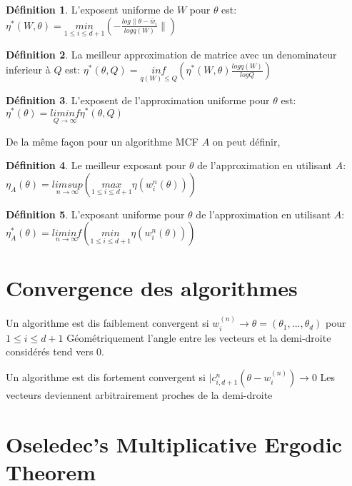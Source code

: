 \documentclass[12pt]{article}
\theoremstyle{plain}%
\theoremstyle{definition}
\newtheorem{dfnt}{Définition}[section]
\theoremstyle{remark}
\begin{document}
\begin{dfnt}
  L'exposent uniforme de $W$ pour $\theta$ est:
  $\eta^*(W,\theta)=\underset{1 \leq i \leq d+1}{min}(-\frac{log \| \theta - \tilde{w_i}}{log q(W)} \|)$
\end{dfnt}

\begin{dfnt}
  La meilleur approximation de matrice avec un denominateur inferieur à $Q$ est:
  $\eta^{*}(\theta,Q)=\underset{q(W) \leq Q}{inf} (\eta^{*}(W,\theta)\frac{log q(W)}{log Q})$
\end{dfnt}

\begin{dfnt}
  L'exposent de l'approximation uniforme pour $\theta$ est:
  $\eta^*(\theta)=\underset{Q \to \infty}{lim inf} \eta^*(\theta,Q)$
\end{dfnt}

De la même façon pour un algorithme MCF $A$ on peut définir,

\begin{dfnt}
  Le meilleur exposant pour $\theta$ de l'approximation en utilisant $A$:
  $\eta_A(\theta)=\underset{n \to \infty}{limsup}(\underset{1 \leq i \leq d+1}{max} \eta(w^n_i(\theta)))$
\end{dfnt}

\begin{dfnt}
  L'exposant uniforme pour $\theta$ de l'approximation en utilisant $A$:
  $\eta^*_A(\theta)=\underset{n \to \infty}{liminf}(\underset{1 \leq i \leq d+1}{min} \eta(w^n_i(\theta)))$
\end{dfnt}

\section{Convergence des algorithmes}

Un algorithme est dis faiblement convergent si $w_i^(n)\to \theta = (\theta_1,...,\theta_d)$ pour $1 \leq i \leq d+1$
Géométriquement l'angle entre les vecteurs et la demi-droite considérés tend vers $0$.

Un algorithme est dis fortement convergent si $|c_{i,d+1}^{n}(\theta-w_i^(n)) \to 0$
Les vecteurs deviennent arbitrairement proches de la demi-droite

\section{Oseledec's Multiplicative Ergodic Theorem}
\end{document}
